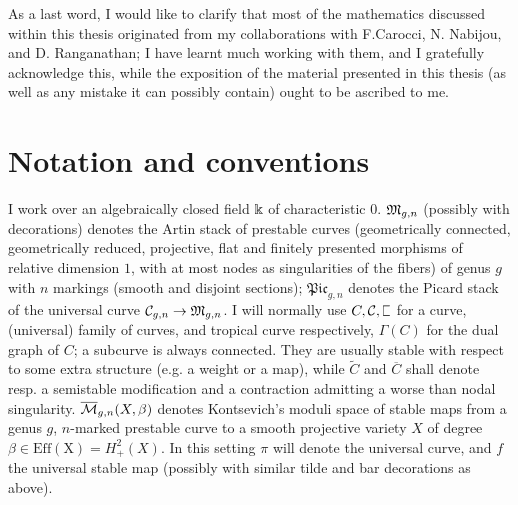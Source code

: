As a last word, I would like to clarify that most of the mathematics discussed within this thesis originated from my collaborations with F.Carocci, N. Nabijou, and D. Ranganathan; I have learnt much working with them, and I gratefully acknowledge this, while the exposition of the material presented in this thesis (as well as any mistake it can possibly contain) ought to be ascribed to me.

\section*{Notation and conventions}
I work over an algebraically closed field $\Bbbk$ of characteristic $0$. $\mathfrak M_{g,n}$ (possibly with decorations) denotes the Artin stack of prestable curves (geometrically connected, geometrically reduced, projective, flat and finitely presented morphisms of relative dimension $1$, with at most nodes as singularities of the fibers) of genus $g$ with $n$ markings (smooth and disjoint sections); $\mathfrak{Pic}_{g,n}$ denotes the Picard stack of the universal curve $\mathcal C_{g,n}\rightarrow\mathfrak M_{g,n}$. I will normally use $C,\mathcal C,\plC$ for a curve, (universal) family of curves, and tropical curve respectively, $\Gamma(C)$ for the dual graph of $C$; a subcurve is always connected. They are usually stable with respect to some extra structure (e.g. a weight or a map), while $\widetilde{C}$ and $\overline{C}$ shall denote resp. a semistable modification and a contraction admitting a worse than nodal singularity. $\overline{\mathcal{M}}_{g,n}(X,\beta)$ denotes Kontsevich's moduli space of stable maps from a genus $g$, $n$-marked prestable curve to a smooth projective variety $X$ of degree $\beta\in\operatorname{Eff(X)}=H^2_+(X)$. In this setting $\pi$ will denote the universal curve, and $f$ the universal stable map (possibly with similar tilde and bar decorations as above).
